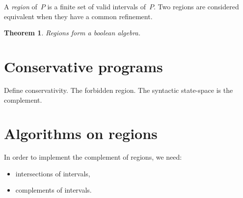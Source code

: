 \documentclass[a4paper]{article}
\theoremstyle{theorem}
\newtheorem{theorem}{Theorem}
\theoremstyle{example}
\theoremstyle{remark}
\begin{document}
A \emph{region} of~$P$ is a finite set of valid intervals of~$P$. Two regions
are considered equivalent when they have a common refinement.

\begin{theorem}
  Regions form a boolean algebra.
\end{theorem}

\section{Conservative programs}
Define conservativity. The forbidden region. The syntactic state-space is the
complement.

\section{Algorithms on regions}
In order to implement the complement of regions, we need:
\begin{itemize}
\item intersections of intervals,
\item complements of intervals.
\end{itemize}
\end{document}
